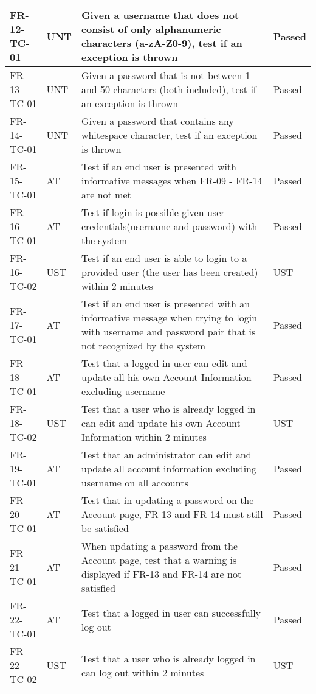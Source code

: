 \documentclass[../report.tex]{subfiles}
\begin{document}
\begin{longtable}{|L{2.1cm}|L{1cm}|L{12.4cm}|L{1.4cm}|}
FR-12-TC-01&UNT&Given a username that does not consist of only alphanumeric characters (a-zA-Z0-9), test if an exception is thrown&Passed  \\ \hline
FR-13-TC-01&UNT&Given a password that is not between 1 and 50 characters (both included), test if an exception is thrown&Passed  \\ \hline
FR-14-TC-01&UNT&Given a password that contains any whitespace character, test if an exception is thrown&Passed  \\ \hline
FR-15-TC-01&AT&Test if an end user is presented with informative messages when FR-09 - FR-14 are not met&Passed  \\ \hline
FR-16-TC-01&AT&Test if login is possible given user credentials(username and password) with the system&Passed  \\ \hline
FR-16-TC-02&UST&Test if an end user is able to login to a provided user (the user has been created) within 2 minutes&UST  \\ \hline
FR-17-TC-01&AT&Test if an end user is presented with an informative message when trying to login with username and password pair that is not recognized by the system&Passed  \\ \hline
FR-18-TC-01&AT&Test that a logged in user can edit and update all his own Account Information excluding username&Passed  \\ \hline
FR-18-TC-02&UST&Test that a user who is already logged in can edit and update his own Account Information within 2 minutes&UST  \\ \hline
FR-19-TC-01&AT&Test that an administrator can edit and update all account information excluding username on all accounts&Passed  \\ \hline
FR-20-TC-01&AT&Test that in updating a password on the Account page, FR-13 and FR-14 must still be satisfied&Passed  \\ \hline
FR-21-TC-01&AT&When updating a password from the Account page, test that a warning is displayed if FR-13 and FR-14 are not satisfied&Passed  \\ \hline
FR-22-TC-01&AT&Test that a logged in user can successfully log out&Passed  \\ \hline
FR-22-TC-02&UST&Test that a user who is already logged in can log out within 2 minutes&UST  \\ \hline

\end{longtable}
\end{document}
